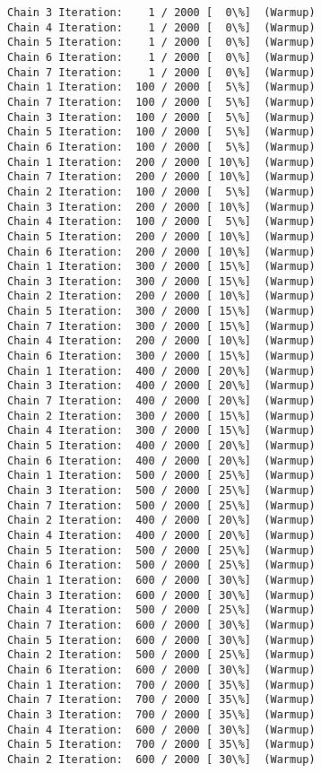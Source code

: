 \documentclass[11pt]{article}
\begin{document}
    \begin{Verbatim}[commandchars=\\\{\}]
Chain 3 Iteration:    1 / 2000 [  0\%]  (Warmup)
Chain 4 Iteration:    1 / 2000 [  0\%]  (Warmup)
Chain 5 Iteration:    1 / 2000 [  0\%]  (Warmup)
Chain 6 Iteration:    1 / 2000 [  0\%]  (Warmup)
Chain 7 Iteration:    1 / 2000 [  0\%]  (Warmup)
Chain 1 Iteration:  100 / 2000 [  5\%]  (Warmup)
Chain 7 Iteration:  100 / 2000 [  5\%]  (Warmup)
Chain 3 Iteration:  100 / 2000 [  5\%]  (Warmup)
Chain 5 Iteration:  100 / 2000 [  5\%]  (Warmup)
Chain 6 Iteration:  100 / 2000 [  5\%]  (Warmup)
Chain 1 Iteration:  200 / 2000 [ 10\%]  (Warmup)
Chain 7 Iteration:  200 / 2000 [ 10\%]  (Warmup)
Chain 2 Iteration:  100 / 2000 [  5\%]  (Warmup)
Chain 3 Iteration:  200 / 2000 [ 10\%]  (Warmup)
Chain 4 Iteration:  100 / 2000 [  5\%]  (Warmup)
Chain 5 Iteration:  200 / 2000 [ 10\%]  (Warmup)
Chain 6 Iteration:  200 / 2000 [ 10\%]  (Warmup)
Chain 1 Iteration:  300 / 2000 [ 15\%]  (Warmup)
Chain 3 Iteration:  300 / 2000 [ 15\%]  (Warmup)
Chain 2 Iteration:  200 / 2000 [ 10\%]  (Warmup)
Chain 5 Iteration:  300 / 2000 [ 15\%]  (Warmup)
Chain 7 Iteration:  300 / 2000 [ 15\%]  (Warmup)
Chain 4 Iteration:  200 / 2000 [ 10\%]  (Warmup)
Chain 6 Iteration:  300 / 2000 [ 15\%]  (Warmup)
Chain 1 Iteration:  400 / 2000 [ 20\%]  (Warmup)
Chain 3 Iteration:  400 / 2000 [ 20\%]  (Warmup)
Chain 7 Iteration:  400 / 2000 [ 20\%]  (Warmup)
Chain 2 Iteration:  300 / 2000 [ 15\%]  (Warmup)
Chain 4 Iteration:  300 / 2000 [ 15\%]  (Warmup)
Chain 5 Iteration:  400 / 2000 [ 20\%]  (Warmup)
Chain 6 Iteration:  400 / 2000 [ 20\%]  (Warmup)
Chain 1 Iteration:  500 / 2000 [ 25\%]  (Warmup)
Chain 3 Iteration:  500 / 2000 [ 25\%]  (Warmup)
Chain 7 Iteration:  500 / 2000 [ 25\%]  (Warmup)
Chain 2 Iteration:  400 / 2000 [ 20\%]  (Warmup)
Chain 4 Iteration:  400 / 2000 [ 20\%]  (Warmup)
Chain 5 Iteration:  500 / 2000 [ 25\%]  (Warmup)
Chain 6 Iteration:  500 / 2000 [ 25\%]  (Warmup)
Chain 1 Iteration:  600 / 2000 [ 30\%]  (Warmup)
Chain 3 Iteration:  600 / 2000 [ 30\%]  (Warmup)
Chain 4 Iteration:  500 / 2000 [ 25\%]  (Warmup)
Chain 7 Iteration:  600 / 2000 [ 30\%]  (Warmup)
Chain 5 Iteration:  600 / 2000 [ 30\%]  (Warmup)
Chain 2 Iteration:  500 / 2000 [ 25\%]  (Warmup)
Chain 6 Iteration:  600 / 2000 [ 30\%]  (Warmup)
Chain 1 Iteration:  700 / 2000 [ 35\%]  (Warmup)
Chain 7 Iteration:  700 / 2000 [ 35\%]  (Warmup)
Chain 3 Iteration:  700 / 2000 [ 35\%]  (Warmup)
Chain 4 Iteration:  600 / 2000 [ 30\%]  (Warmup)
Chain 5 Iteration:  700 / 2000 [ 35\%]  (Warmup)
Chain 2 Iteration:  600 / 2000 [ 30\%]  (Warmup)

\end{Verbatim}
\end{document}
